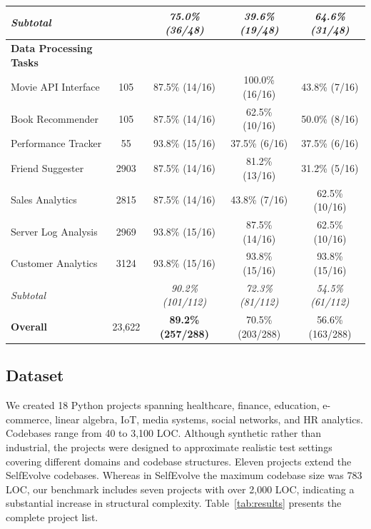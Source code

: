 \documentclass[sigconf,screen]{acmart}
\begin{document}
\begin{table}[!t]
\begin{tabular}{lcccc}
\hspace{3pt}\textit{Subtotal} & & \textit{75.0\% (36/48)} & \textit{39.6\% (19/48)} & \textit{64.6\% (31/48)} \\
\midrule
\textbf{Data Processing Tasks} & & & & \\
\hspace{3pt}Movie API Interface & 105 & 87.5\% (14/16) & 100.0\% (16/16) & 43.8\% (7/16) \\
\hspace{3pt}Book Recommender & 105 & 87.5\% (14/16) & 62.5\% (10/16) & 50.0\% (8/16) \\
\hspace{3pt}Performance Tracker & 55 & 93.8\% (15/16) & 37.5\% (6/16) & 37.5\% (6/16) \\
\hspace{3pt}Friend Suggester & 2903 & 87.5\% (14/16) & 81.2\% (13/16) & 31.2\% (5/16) \\
\hspace{3pt}Sales Analytics & 2815 & 87.5\% (14/16) & 43.8\% (7/16) & 62.5\% (10/16) \\
\hspace{3pt}Server Log Analysis & 2969 & 93.8\% (15/16) & 87.5\% (14/16) & 62.5\% (10/16) \\
\hspace{3pt}Customer Analytics & 3124 & 93.8\% (15/16) & 93.8\% (15/16) & 93.8\% (15/16) \\
\hspace{3pt}\textit{Subtotal} & & \textit{90.2\% (101/112)} & \textit{72.3\% (81/112)} & \textit{54.5\% (61/112)} \\
\midrule
\textbf{Overall} & 23,622 & \textbf{89.2\% (257/288)} & 70.5\% (203/288) & 56.6\% (163/288) \\
\bottomrule
\end{tabular}
\end{table}

\subsection{Dataset}

We created 18 Python projects spanning healthcare,
finance, education, e-commerce, linear algebra, IoT, media systems, social networks, and HR analytics. Codebases range from 40 to 3,100 LOC. Although synthetic rather than industrial, the projects were designed to approximate realistic test settings covering different domains and codebase structures. Eleven projects extend the SelfEvolve codebases. Whereas in SelfEvolve the maximum codebase size was 783 LOC, our benchmark includes seven projects with over 2,000 LOC, indicating a substantial increase in structural complexity.
Table~\ref{tab:results} presents the complete project list.
\end{document}
